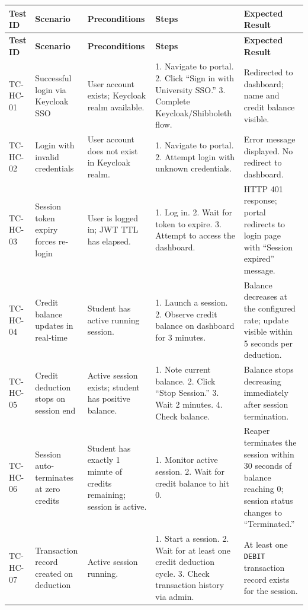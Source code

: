 \documentclass[12pt,a4paper]{article}
\begin{document}
\begin{longtable}{@{}L{2cm}L{3cm}L{3cm}L{3.5cm}L{3cm}@{}}
  
    \textbf{Test ID} & \textbf{Scenario} & \textbf{Preconditions} & \textbf{Steps} & \textbf{Expected Result} \\
  \midrule
  \endfirsthead
  
    \textbf{Test ID} & \textbf{Scenario} & \textbf{Preconditions} & \textbf{Steps} & \textbf{Expected Result} \\
  \midrule
  \endhead
  
  \endfoot

  TC-HC-01 & Successful login via Keycloak SSO & User account exists; Keycloak realm available. & 1. Navigate to portal. 2. Click ``Sign in with University SSO.'' 3. Complete Keycloak/Shibboleth flow. & Redirected to dashboard; name and credit balance visible. \\
    TC-HC-02 & Login with invalid credentials & User account does not exist in Keycloak realm. & 1. Navigate to portal. 2. Attempt login with unknown credentials. & Error message displayed. No redirect to dashboard. \\
  TC-HC-03 & Session token expiry forces re-login & User is logged in; JWT TTL has elapsed. & 1. Log in. 2. Wait for token to expire. 3. Attempt to access the dashboard. & HTTP 401 response; portal redirects to login page with ``Session expired'' message. \\
    TC-HC-04 & Credit balance updates in real-time & Student has active running session. & 1. Launch a session. 2. Observe credit balance on dashboard for 3 minutes. & Balance decreases at the configured rate; update visible within 5 seconds per deduction. \\
  TC-HC-05 & Credit deduction stops on session end & Active session exists; student has positive balance. & 1. Note current balance. 2. Click ``Stop Session.'' 3. Wait 2 minutes. 4. Check balance. & Balance stops decreasing immediately after session termination. \\
    TC-HC-06 & Session auto-terminates at zero credits & Student has exactly 1 minute of credits remaining; session is active. & 1. Monitor active session. 2. Wait for credit balance to hit 0. & Reaper terminates the session within 30 seconds of balance reaching 0; session status changes to ``Terminated.'' \\
  TC-HC-07 & Transaction record created on deduction & Active session running. & 1. Start a session. 2. Wait for at least one credit deduction cycle. 3. Check transaction history via admin. & At least one \texttt{DEBIT} transaction record exists for the session. \\

\end{longtable}
\end{document}
